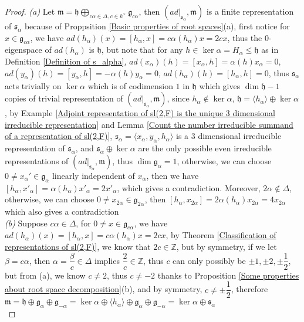 \documentclass[main]{subfiles}
\begin{document}
\begin{proof}
\textit{(a) }Let $\mathfrak{m}=\mathfrak{h}\displaystyle\bigoplus_{c\alpha\in\Delta,c\in k^\times}\mathfrak{g}_{c\alpha}$, then $(ad|_{\mathfrak{s}_\alpha},\mathfrak{m})$ is a finite representation of $\mathfrak{s}_\alpha$ because of Proppsition \ref{Basic properties of root spaces}(a), first notice for $x\in\mathfrak{g}_{c\alpha}$, we have $ad(h_\alpha)(x)=[h_\alpha,x]=c\alpha(h_\alpha)x=2cx$, thus the $0$-eigenspace of $ad(h_\alpha)$ is $\mathfrak{h}$, but note that for any $h\in\ker\alpha=H_\alpha\leq\mathfrak{h}$ as in Definition \ref{Definition of s_alpha}, $ad(x_\alpha)(h)=[x_\alpha,h]=\alpha(h)x_\alpha=0$, $ad(y_\alpha)(h)=[y_\alpha,h]=-\alpha(h)y_\alpha=0$, $ad(h_\alpha)(h)=[h_\alpha,h]=0$, thus $\mathfrak{s}_\alpha$ acts trivially on $\ker\alpha$ which is of codimension $1$ in $\mathfrak{h}$ which gives $\dim\mathfrak{h}-1$ copies of trivial representation of $(ad|_{\mathfrak{s}_\alpha},\mathfrak{m})$, since $h_\alpha\notin\ker\alpha$, $\mathfrak{h}=\langle h_\alpha\rangle\oplus\ker\alpha$, by Example \ref{Adjoint representation of sl(2,F) is the unique 3 dimensional irreducible representation} and Lemma \ref{Count the number irreducible summand of a representation of sl(2,F)}, $\mathfrak{s}_\alpha=\langle x_\alpha,y_\alpha,h_\alpha\rangle$ is a $3$ dimensional irreducible representation of $\mathfrak{s}_\alpha$, and $\mathfrak{s}_\alpha\oplus\ker\alpha$ are the only possible even irreducible representations of $(ad|_{\mathfrak{s}_\alpha},\mathfrak{m})$, thus $\dim\mathfrak{g}_\alpha=1$, otherwise, we can choose $0\neq x_\alpha'\in\mathfrak{g}_\alpha$ linearly independent of $x_\alpha$, then we have $[h_\alpha,x'_\alpha]=\alpha(h_\alpha)x'_\alpha=2x'_\alpha$, which gives a contradiction. Moreover, $2\alpha\notin\Delta$, otherwise, we can choose  $0\neq x_{2\alpha}\in\mathfrak{g}_{2\alpha}$, then $[h_\alpha,x_{2\alpha}]=2\alpha(h_\alpha)x_{2\alpha}=4x_{2\alpha}$which also gives a contradiction \\
\textit{(b) }Suppose $c\alpha\in\Delta$, for $0\neq x\in\mathfrak{g}_{c\alpha}$, we have $ad(h_\alpha)(x)=[h_\alpha,x]=c\alpha(h_\alpha)x=2cx$, by Theorem \ref{Classification of representations of sl(2,F)}, we know that $2c\in\mathbb Z$, but by symmetry, if we let $\beta=c\alpha$, then $\alpha=\dfrac{\beta}{c}\in\Delta$ implies $\dfrac{2}{c}\in\mathbb Z$, thus $c$ can only possibly be $\pm1,\pm2,\pm\dfrac{1}{2}$, but from (a), we know $c\neq2$, thus $c\neq-2$ thanks to Proposition \ref{Some properties about root space decomposition}(b), and by symmetry, $c\neq\pm\dfrac{1}{2}$, therefore $\mathfrak{m}=\mathfrak{h}\oplus\mathfrak{g}_{\alpha}\oplus\mathfrak{g}_{-\alpha}=\ker\alpha\oplus\langle h_\alpha\rangle\oplus\mathfrak{g}_{\alpha}\oplus\mathfrak{g}_{-\alpha}=\ker\alpha\oplus\mathfrak{s}_{\alpha}$ \\

\end{proof}
\end{document}

